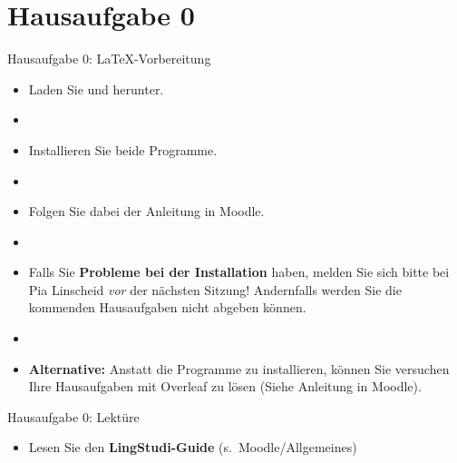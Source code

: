 \section{Hausaufgabe 0}

\begin{frame}{Hausaufgabe 0: \LaTeX -Vorbereitung}

\begin{itemize}
	\item Laden Sie  und   herunter.
	\item[]
	
	\item Installieren Sie beide Programme.
	\item[]
	
	\item Folgen Sie dabei der Anleitung in Moodle.
	\item[]
	
	\item Falls Sie \textbf{Probleme bei der Installation} haben, melden Sie sich bitte bei Pia Linscheid \emph{vor} der nächsten Sitzung! Andernfalls werden Sie die kommenden Hausaufgaben nicht abgeben können.
	
	\item[]
	
	\item \textbf{Alternative:} Anstatt die Programme zu installieren, können Sie versuchen Ihre Hausaufgaben mit Overleaf zu lösen (Siehe Anleitung in Moodle).
\end{itemize}

\end{frame}


\begin{frame}{Hausaufgabe 0: Lektüre}

\begin{itemize}
\item Lesen Sie den \textbf{LingStudi-Guide} (s.~Moodle/Allgemeines)
\end{itemize}

\end{frame}



